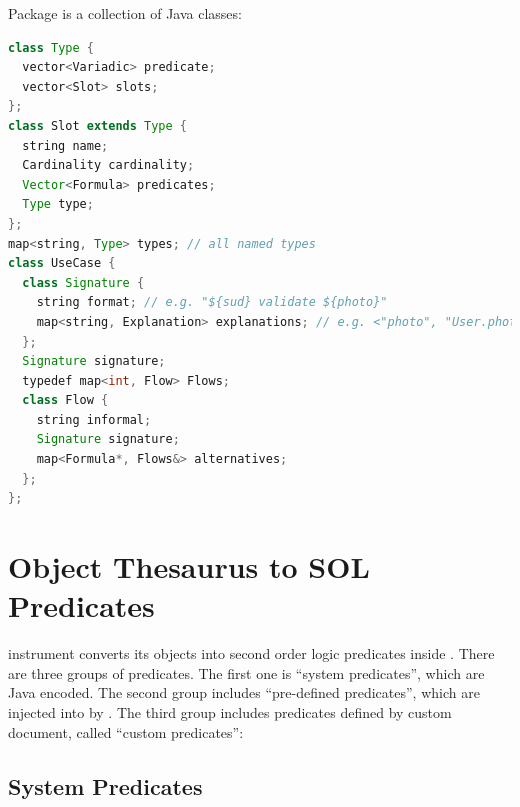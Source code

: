 \documentclass[12pt,oneside,letterpaper]{article}
\begin{document}
        Package  is a collection of Java classes:

    \begin{lstlisting}[language=Java]
class Type {
  vector<Variadic> predicate;
  vector<Slot> slots;
};
class Slot extends Type {
  string name;
  Cardinality cardinality;
  Vector<Formula> predicates;
  Type type;
};
map<string, Type> types; // all named types
class UseCase {
  class Signature {
    string format; // e.g. "${sud} validate ${photo}"
    map<string, Explanation> explanations; // e.g. <"photo", "User.photos">
  };
  Signature signature;
  typedef map<int, Flow> Flows;
  class Flow {
    string informal;
    Signature signature;
    map<Formula*, Flows&> alternatives;
  };
};
\end{lstlisting}




\section{Object Thesaurus to SOL Predicates}
\label{sec:to-solm}

     instrument converts
    its objects into second order logic predicates
    inside . There are
    three groups of predicates. The first one is ``system predicates'', which
    are Java encoded. The second group includes ``pre-defined predicates'',
    which are injected into  by . The third group includes
    predicates defined by custom document, called ``custom predicates'':


    \subsection{System Predicates}
\end{document}
